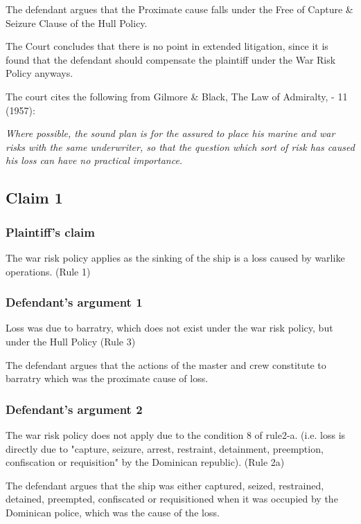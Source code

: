     The defendant argues that the Proximate cause falls under the Free of Capture \& Seizure Clause of the Hull Policy.
    
    The Court concludes that there is no point in extended litigation, since it is found that the defendant should compensate the plaintiff under the War Risk Policy anyways.
        
    The court cites the following from Gilmore \& Black, The Law of Admiralty, - 11 (1957):
    
    \textit{Where possible, the sound plan is for the assured to place his marine and war risks
    with the same underwriter, so that the question which sort of risk has caused his
    loss can have no practical importance.}


\subsection{Claim 1}

\subsubsection{Plaintiff's claim}

The war risk policy applies as the sinking of the ship is a loss caused by warlike operations. (Rule 1)

\subsubsection{Defendant's argument 1}

Loss was due to barratry, which does not exist under the war risk policy, but under the Hull Policy (Rule 3)
    
The defendant argues that the actions of the master and crew constitute to barratry which was the proximate cause of loss.

\subsubsection{Defendant's argument 2}

The war risk policy does not apply due to the condition 8 of rule2-a. (i.e. loss is directly due to "capture, seizure, arrest, restraint, detainment, preemption, confiscation or requisition" by the Dominican republic). (Rule 2a)

The defendant argues that the ship was either captured, seized, restrained, detained, preempted, confiscated or requisitioned when it was occupied by the Dominican police, which was the cause of the loss.

